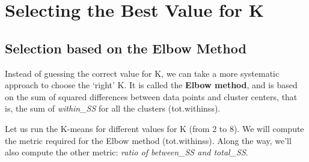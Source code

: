 \documentclass[]{article}
\newenvironment{Shaded}{\begin{snugshade}}{\end{snugshade}}
\newcommand{\KeywordTok}[1]{\textcolor[rgb]{0.13,0.29,0.53}{\textbf{#1}}}
\newcommand{\DataTypeTok}[1]{\textcolor[rgb]{0.13,0.29,0.53}{#1}}
\newcommand{\DecValTok}[1]{\textcolor[rgb]{0.00,0.00,0.81}{#1}}
\newcommand{\StringTok}[1]{\textcolor[rgb]{0.31,0.60,0.02}{#1}}
\newcommand{\CommentTok}[1]{\textcolor[rgb]{0.56,0.35,0.01}{\textit{#1}}}
\newcommand{\OtherTok}[1]{\textcolor[rgb]{0.56,0.35,0.01}{#1}}
\newcommand{\ControlFlowTok}[1]{\textcolor[rgb]{0.13,0.29,0.53}{\textbf{#1}}}
\newcommand{\OperatorTok}[1]{\textcolor[rgb]{0.81,0.36,0.00}{\textbf{#1}}}
\newcommand{\NormalTok}[1]{#1}
\begin{document}
\section{Selecting the Best Value for
K}\label{selecting-the-best-value-for-k}

\subsection{Selection based on the Elbow
Method}\label{selection-based-on-the-elbow-method}

Instead of guessing the correct value for K, we can take a more
systematic approach to choose the `right' K. It is called the
\textbf{Elbow method}, and is based on the sum of squared differences
between data points and cluster centers, that is, the sum of
\emph{within\_SS} for all the clusters (tot.withinss).

Let us run the K-means for different values for K (from 2 to 8). We will
compute the metric required for the Elbow method (tot.withinss). Along
the way, we'll also compute the other metric: \emph{ratio of between\_SS
and total\_SS}.

\begin{Shaded}
\end{Shaded}
\end{document}
